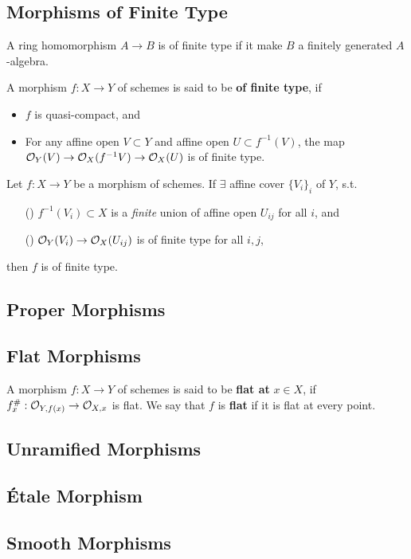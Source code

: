 \subsection{Morphisms of Finite Type}
A ring homomorphism $A\to B$ is of finite type if it make $B$ a finitely generated $A$-algebra. 

A morphism $f: X\to Y$ of schemes is said to be
\textbf{of finite type}, if
\begin{itemize}
    \item $f$ is quasi-compact, and
    \item For any affine open $V\subset Y$ and affine open $U\subset f^{-1}(V)$, the map $\mathcal{O}_Y(V)\to\mathcal{O}_X(f^{-1}V)\to\mathcal{O}_X(U)$ is of finite type.
\end{itemize}

\begin{proposition}
    Let $f : X\to Y$ be a morphism of schemes.
    If $\exists$ affine cover $\{V_i\}_i$ of $Y$, 
    s.t.\begin{enumerate}
        \item [(\rmnum{1})] $f^{-1}(V_i)\subset X$ is a \textit{finite} union of affine open $U_{ij}$ for all $i$, and
        \item [(\rmnum{2})] $\mathcal{O}_Y(V_i)\to \mathcal{O}_X(U_{ij})$ is of finite type for all $i, j$,
    \end{enumerate}
    then $f$ is of finite type.
\end{proposition}

\subsection{Proper Morphisms}

\subsection{Flat Morphisms}
A morphism $f : X\to Y$ of schemes is said to be
\textbf{flat at} $x\in X$, if $f^\#_x : \mathcal{O}_{Y, f(x)}\to \mathcal{O}_{X, x}$ is flat.
We say that $f$ is \textbf{flat} if it is flat at every point.

\subsection{Unramified Morphisms}

\subsection{\'Etale Morphism}

\subsection{Smooth Morphisms}

